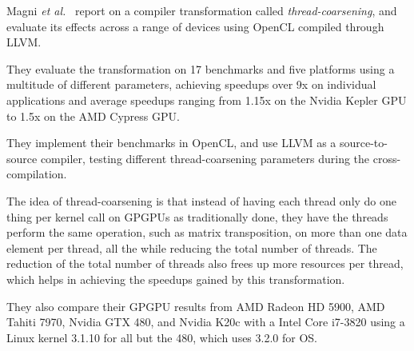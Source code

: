 Magni \textit{et al.}~\cite{Magni:2013:LCE:2503210.2503268} report on a compiler transformation called \textit{thread-coarsening}, and evaluate its effects across a range of devices using OpenCL compiled through LLVM.

They evaluate the transformation on 17 benchmarks and five platforms using a multitude of different parameters, achieving speedups over 9x on individual applications and average speedups ranging from 1.15x on the Nvidia Kepler GPU to 1.5x on the AMD Cypress GPU.

They implement their benchmarks in OpenCL, and use LLVM as a source-to-source compiler, testing different thread-coarsening parameters during the cross-compilation.

The idea of thread-coarsening is that instead of having each thread only do one thing per kernel call on GPGPUs as traditionally done, they have the threads perform the same operation, such as matrix transposition, on more than one data element per thread, all the while reducing the total number of threads.
The reduction of the total number of threads also frees up more resources per thread, which helps in achieving the speedups gained by this transformation.

They also compare their GPGPU results from AMD Radeon HD 5900, AMD Tahiti 7970, Nvidia GTX 480, and Nvidia K20c with a Intel Core i7-3820 using a Linux kernel 3.1.10 for all but the 480, which uses 3.2.0 for OS.
